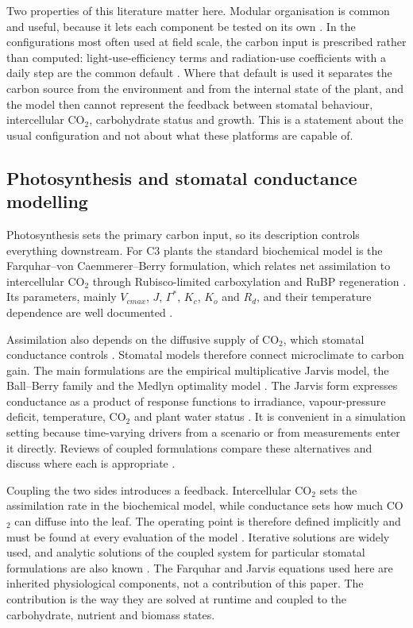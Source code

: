 Two properties of this literature matter here. Modular organisation is common
and useful, because it lets each component be tested on its own
\cite{Sievnen2014,Zeigler2000}. In the configurations most often used at field
scale, the carbon input is prescribed rather than computed: light-use-efficiency
terms and radiation-use coefficients with a daily step are the common default
\cite{Jones2003,deWit2019,Holzworth2014}. Where that default is used it
separates the carbon source from the environment and from the internal state of
the plant, and the model then cannot represent the feedback between stomatal
behaviour, intercellular CO$_2$, carbohydrate status and growth. This is a
statement about the usual configuration and not about what these platforms are
capable of.

\subsection{Photosynthesis and stomatal conductance modelling}

Photosynthesis sets the primary carbon input, so its description controls
everything downstream. For C3 plants the standard biochemical model is the
Farquhar--von Caemmerer--Berry formulation, which relates net assimilation to
intercellular CO$_2$ through Rubisco-limited carboxylation and RuBP
regeneration \cite{Farquhar1980,vonCaemmerer2000}. Its parameters, mainly
$V_{cmax}$, $J$, $\Gamma^*$, $K_c$, $K_o$ and $R_d$, and their temperature
dependence are well documented \cite{Sharkey2007,Bernacchi2001,Dubois2007}.

Assimilation also depends on the diffusive supply of CO$_2$, which stomatal
conductance controls \cite{Lawson2014}. Stomatal models therefore connect
microclimate to carbon gain. The main formulations are the empirical
multiplicative Jarvis model, the Ball--Berry family and the Medlyn optimality
model \cite{Jarvis1976,Ball1987,Medlyn2011}. The Jarvis form expresses
conductance as a product of response functions to irradiance, vapour-pressure
deficit, temperature, CO$_2$ and plant water status \cite{Jarvis1976,YU2017,Yu2021}.
It is convenient in a simulation setting because time-varying drivers from a
scenario or from measurements enter it directly. Reviews of coupled
formulations compare these alternatives and discuss where each is appropriate
\cite{Damour2010,Buckley2017}.

Coupling the two sides introduces a feedback. Intercellular CO$_2$ sets the
assimilation rate in the biochemical model, while conductance sets how much
CO$_2$ can diffuse into the leaf. The operating point is therefore defined
implicitly and must be found at every evaluation of the model
\cite{Damour2010}. Iterative solutions are widely used, and analytic solutions
of the coupled system for particular stomatal formulations are also known
\cite{Buckley2017,Kim2003}. The Farquhar and Jarvis equations used here are
inherited physiological components, not a contribution of this paper. The
contribution is the way they are solved at runtime and coupled to the
carbohydrate, nutrient and biomass states.

